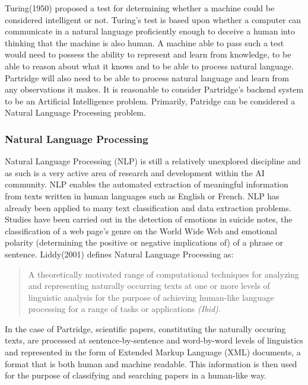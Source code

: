 \documentclass[12pt,a4paper]{article}
\begin{document}
Turing(1950) proposed a test for determining whether a machine could be
considered intelligent or not\cite{turing1950computing}. Turing's test is based
upon whether a computer can communicate in a natural language proficiently
enough to deceive a human into thinking that the machine is also human. A
machine able to pass such a test would need to possess the ability to represent
and learn from knowledge, to be able to reason about what it knows and to be
able to process natural language\cite{russell2010artificial}. Partridge will
also need to be able to process natural language and learn from any
observations it makes. It is reasonable to consider Partridge's backend system
to be an Artificial Intelligence problem. Primarily, Patridge can be considered
a Natural Language Processing problem.


\subsubsection{Natural Language Processing} 

Natural Language Processing (NLP) is still a relatively unexplored discipline
and as such is a very active area of research and development within the AI
community\cite{liddy2001natural}. NLP enables the automated extraction of
meaningful information from texts written in human languages such as English or
French. NLP has already been applied to many text classification and data
extraction problems. Studies have been carried out in the detection of emotions
in suicide notes\cite{citeulike:11077287}, the classification of a web page's
genre on the World Wide Web\cite{citeulike:11288938} and emotional polarity
(determining the positive or negative implications of) of a phrase or
sentence\cite{Wilson05Polarity}. Liddy(2001) defines Natural Language
Processing as:

\begin{quotation} 
A theoretically motivated range of computational techniques for analyzing and
representing naturally occurring texts at one or more levels of linguistic
analysis for the purpose of achieving human-like language processing for a
range of tasks or applications \it{(Ibid)}.  
\end{quotation}

In the case of Partridge, scientific papers, constituting the naturally occuring
texts, are processed at sentence-by-sentence and word-by-word levels of
linguistics and represented in the form of Extended Markup Language (XML)
documents, a format that is both human and machine readable. This information
is then used for the purpose of classifying and searching papers in a
human-like way. 
\end{document}
